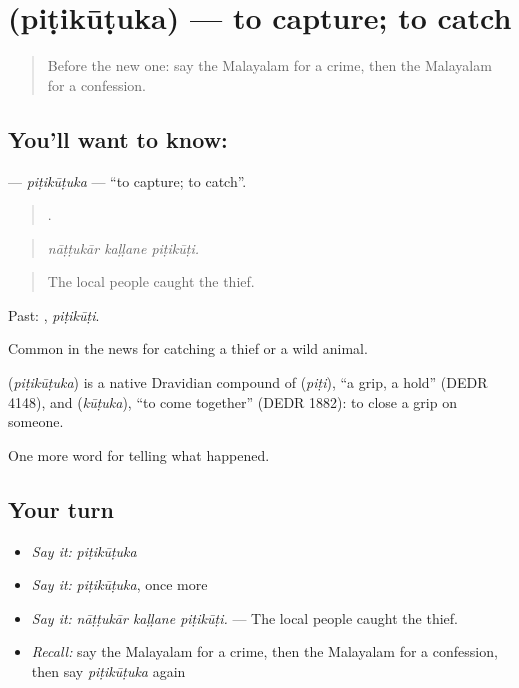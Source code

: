 \section[\texorpdfstring{\ml{പിടികൂടുക} (piṭikūṭuka)}{പിടികൂടുക (piṭikūṭuka)}]{ (piṭikūṭuka) — to capture; to catch}

\label{lesson:ML-C367-pitikutuka}



\begin{quote}
Before the new one: say the Malayalam for a crime, then the Malayalam for a confession.
\end{quote}

\subsection*{You'll want to know: }
\textbf{} — \emph{piṭikūṭuka} — \textquotedblleft{}to capture; to catch\textquotedblright{}.

\begin{quote}
  .
\end{quote}

\begin{quote}
\emph{nāṭṭukār kaḷḷane piṭikūṭi.}
\end{quote}

\begin{quote}
The local people caught the thief.
\end{quote}

Past: , \emph{piṭikūṭi}.

Common in the news for catching a thief or a wild animal.

\begin{cousinweb}
\textbf{} (\emph{piṭikūṭuka}) is a native Dravidian compound of  (\emph{piṭi}), \textquotedblleft{}a grip, a hold\textquotedblright{} (DEDR 4148), and  (\emph{kūṭuka}), \textquotedblleft{}to come together\textquotedblright{} (DEDR 1882): to close a grip on someone.
\end{cousinweb}

\begin{grammarlens}[title={What you've built}]
One more word for telling what happened.
\end{grammarlens}

\subsection*{Your turn}
\begin{itemize}
\raggedright
  \item \emph{Say it:} \emph{piṭikūṭuka}
  \item \emph{Say it:} \emph{piṭikūṭuka}, once more
  \item \emph{Say it:} \emph{nāṭṭukār kaḷḷane piṭikūṭi.} — The local people caught the thief.
  \item \emph{Recall:} say the Malayalam for a crime, then the Malayalam for a confession, then say \emph{piṭikūṭuka} again
\end{itemize}

